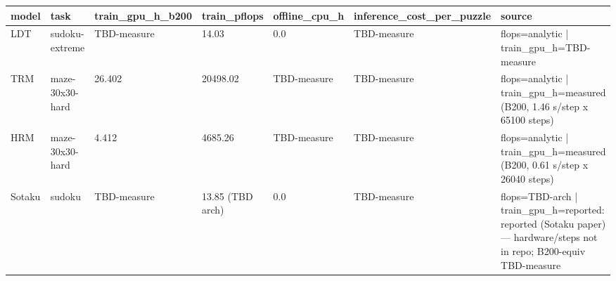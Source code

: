 \begin{tabular}{lllllll}
\toprule
model & task & train\_gpu\_h\_b200 & train\_pflops & offline\_cpu\_h & inference\_cost\_per\_puzzle & source \\
\midrule
LDT & sudoku-extreme & TBD-measure & 14.03 & 0.0 & TBD-measure & flops=analytic | train\_gpu\_h=TBD-measure \\
TRM & maze-30x30-hard & 26.402 & 20498.02 & TBD-measure & TBD-measure & flops=analytic | train\_gpu\_h=measured (B200, 1.46 s/step x 65100 steps) \\
HRM & maze-30x30-hard & 4.412 & 4685.26 & TBD-measure & TBD-measure & flops=analytic | train\_gpu\_h=measured (B200, 0.61 s/step x 26040 steps) \\
Sotaku & sudoku & TBD-measure & 13.85 (TBD arch) & 0.0 & TBD-measure & flops=TBD-arch | train\_gpu\_h=reported: reported (Sotaku paper) — hardware/steps not in repo; B200-equiv TBD-measure \\
\bottomrule
\end{tabular}
